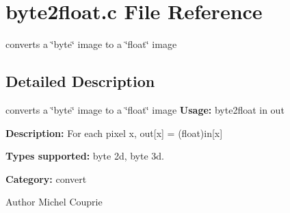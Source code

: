\section{byte2float.c File Reference}
\label{byte2float_8c}


converts a \char`\"{}byte\char`\"{} image to a \char`\"{}float\char`\"{} image  




\subsection{Detailed Description}
converts a \char`\"{}byte\char`\"{} image to a \char`\"{}float\char`\"{} image {\bfseries Usage:} byte2float in out

{\bfseries Description:} For each pixel x, out[x] = (float)in[x]

{\bfseries Types supported:} byte 2d, byte 3d.

{\bfseries Category:} convert

\begin{DoxyAuthor}{Author}
Michel Couprie 
\end{DoxyAuthor}
